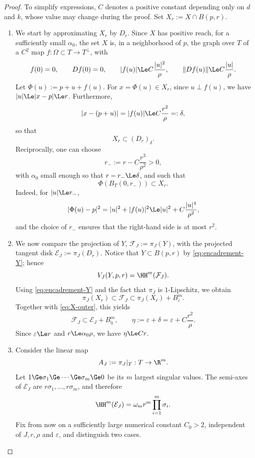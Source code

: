 \begin{proof}
To simplify expressions, $C$ denotes a positive constant depending only
on $d$ and $k$, whose value may change during the proof. Set
$X_r:=X\cap B(p,r)$.
\begin{enumerate}
\item We start by approximating $X_r$ by $D_r$. Since $X$ has positive
reach, for a sufficiently small $\alpha_0$, the set $X$ is, in a
neighborhood of $p$, the graph over $T$ of a $C^2$ map
$f:\Omega\subset T\to T^\perp$, with
\[
 f(0)=0,\qquad Df(0)=0,\qquad
 |f(u)|\Le C\frac{|u|^2}{\rho},\qquad
 \|Df(u)\|\Le C\frac{|u|}{\rho}.
\]
Let $\Phi(u):=p+u+f(u)$. For $x=\Phi(u)\in X_r$, since
$u\perp f(u)$, we have $|u|\Le |x-p|\Le r$. Furthermore,
\[
 |x-(p+u)|=|f(u)|\Le C\frac{r^2}{\rho}=: \delta,
\]
so that
\begin{equation}
\label{eq:X-outer}
 X_r\subset (D_r)_\delta.
\end{equation}
Reciprocally, one can choose
\[
 r_-:=r-C\frac{r^3}{\rho^2}>0,
\]
with $\alpha_0$ small enough so that $r-r_-\Le\delta$, and such that
\begin{equation}
\label{eq:inner-graph}
 \Phi(B_T(0,r_-))\subset X_r.
\end{equation}
Indeed, for $|u|\Le r_-$,
\[
 |\Phi(u)-p|^2=|u|^2+|f(u)|^2
 \Le |u|^2+C\frac{|u|^4}{\rho^2},
\]
and the choice of $r_-$ ensures that the right-hand side is at most
$r^2$.

\item We now compare the projection of $Y$,
$\mathcal F_J:=\pi_J(Y)$, with the projected tangent disk
$\mathcal E_J:=\pi_J(D_r)$. Notice that $Y\subset B(p,r)$ by
\eqref{eq:encadrement-Y}; hence
\[
 V_J(Y,p,r)=\HH^m(\mathcal F_J).
\]
Using \eqref{eq:encadrement-Y} and the fact that $\pi_J$ is
$1$-Lipschitz, we obtain
\[
 \pi_J(X_r)\subset\mathcal F_J
 \subset \pi_J(X_r)+B^m_\varepsilon.
\]
Together with \eqref{eq:X-outer}, this yields
\begin{equation}
\label{eq:outer-projection}
 \mathcal F_J\subset\mathcal E_J+B^m_\eta,
 \qquad
 \eta:=\varepsilon+\delta
 =\varepsilon+C\frac{r^2}{\rho}.
\end{equation}
Since $\varepsilon\Le r$ and $r\Le\alpha_0\rho$, we have
$\eta\Le C r$.

\item Consider the linear map
\[
 A_J:=\pi_J|_T:T\to\R^m.
\]
Let $1\Ge\sigma_1\Ge\cdots\Ge\sigma_m\Ge0$ be its $m$ largest
singular values. The semi-axes of $\mathcal E_J$ are
$r\sigma_1,\ldots,r\sigma_m$, and therefore
\begin{equation}
\label{eq:ellipsoid-volume}
 \HH^m(\mathcal E_J)
 =\omega_m r^m\prod_{i=1}^m\sigma_i.
\end{equation}
Fix from now on a sufficiently large numerical constant $C_0>2$,
independent of $J,r,\rho$ and $\varepsilon$, and distinguish two cases.


\end{enumerate}
\end{proof}
